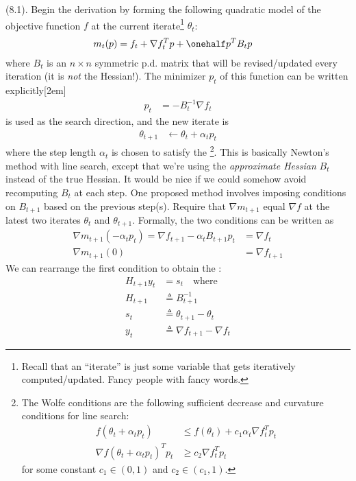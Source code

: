 \documentclass[11pt]{article}
\newcommand\myspace[1][]{\vspace{#1\bigskipamount}}
\newcommand\p{\Needspace{10\baselineskip} \noindent}
\begin{document}
\myspace
\p {} (8.1). Begin the derivation by forming the following quadratic model of the objective function $f$ at the current iterate\footnote{Recall that an ``iterate'' is just some variable that gets iteratively computed/updated. Fancy people with fancy words.} $\theta_t$:
\begin{align}
	m_t(p) &= f_t + \nabla f_t^T p + \onehalf p^T B_t p
\end{align} 
where $B_t$ is an $n \times n$ symmetric p.d. matrix that will be revised/updated every iteration (it is \textit{not} the Hessian!). The minimizer $p_t$ of this function can be written explicitly[2em]
\begin{align}
	p_t &= -B_t^{-1} \nabla f_t
\end{align}
is used as the search direction, and the new iterate is
\begin{align}
	\theta_{t + 1} &\leftarrow \theta_t + \alpha_t p_t
\end{align}
where the step length $\alpha_t$ is chosen to satisfy the \footnote{The Wolfe conditions are the following sufficient decrease and curvature conditions for line search:
\begin{align}
	f(\theta_t + \alpha_t p_t) &\le f(\theta_t) + c_1 \alpha_t \nabla f_t^T p_t \\
	\nabla f(\theta_t + \alpha_t p_t)^T p_t &\ge c_2 \nabla f_t^T p_t
\end{align}
for some constant $c_1 \in (0, 1)$ and $c_2 \in (c_1, 1)$. 
}. This is basically Newton's method with line search, except that we're using the \textit{approximate Hessian} $B_t$ instead of the true Hessian. It would be nice if we could somehow avoid recomputing $B_t$ at each step. One proposed method involves imposing conditions on $B_{t + 1}$ based on the previous step(s). Require that $\nabla m_{t + 1}$ equal $\nabla f$ at the latest two iterates $\theta_t$ and $\theta_{t + 1}$. Formally, the two conditions can be written as
\begin{align}
	\nabla m_{t + 1} (-\alpha_t p_t) = \nabla f_{t + 1} - \alpha_t B_{t + 1} p_t &= \nabla f_t \\
	\nabla m_{t + 1} (0) &= \nabla f_{t + 1}
\end{align}
We can rearrange the first condition to obtain the :
\begin{align}
	H_{t + 1} y_t &= s_t  \quad \text{where} \\
	H_{t + 1} &\triangleq B_{t + 1}^{-1} \\
	s_t &\triangleq \theta_{t + 1} - \theta_t \\
	y_t &\triangleq \nabla f_{t + 1} - \nabla f_t
\end{align}
\end{document}
